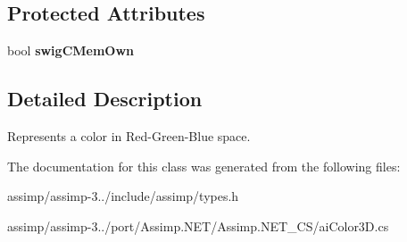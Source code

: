 \subsection*{Protected Attributes}
\begin{DoxyCompactItemize}
\item 
\hypertarget{structai_color3_d_a7250cef041602ab695dd97ae7278bd0d}{bool {\bfseries swig\+C\+Mem\+Own}}\label{structai_color3_d_a7250cef041602ab695dd97ae7278bd0d}

\end{DoxyCompactItemize}


\subsection{Detailed Description}
Represents a color in Red-\/\+Green-\/\+Blue space. 

The documentation for this class was generated from the following files\+:\begin{DoxyCompactItemize}
\item 
assimp/assimp-\/3../include/assimp/types.\+h\item 
assimp/assimp-\/3../port/\+Assimp.\+N\+E\+T/\+Assimp.\+N\+E\+T\+\_\+\+C\+S/ai\+Color3\+D.\+cs\end{DoxyCompactItemize}
